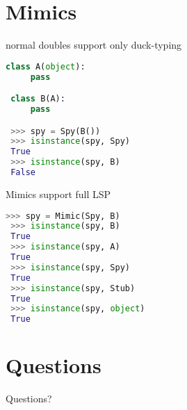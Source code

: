 \documentclass[11pt]{beamer}
\begin{document}
\section{Mimics}

\begin{frame}[fragile]{normal doubles support only duck-typing}

\begin{exampleblock}{}
\begin{lstlisting}[language=Python]
 class A(object):
     pass

 class B(A):
     pass

 >>> spy = Spy(B())
 >>> isinstance(spy, Spy)
 True
 >>> isinstance(spy, B)
 False
\end{lstlisting}
\end{exampleblock}
\end{frame}

\begin{frame}[fragile]{Mimics support full LSP}

\begin{exampleblock}{}
\begin{lstlisting}[language=Python]
 >>> spy = Mimic(Spy, B)
 >>> isinstance(spy, B)
 True
 >>> isinstance(spy, A)
 True
 >>> isinstance(spy, Spy)
 True
 >>> isinstance(spy, Stub)
 True
 >>> isinstance(spy, object)
 True
\end{lstlisting}
\end{exampleblock}
\end{frame}

\section{Questions}

\begin{frame}{}
  \begin{center}
    {\huge Questions?}
  \end{center}

\end{frame}
\end{document}
